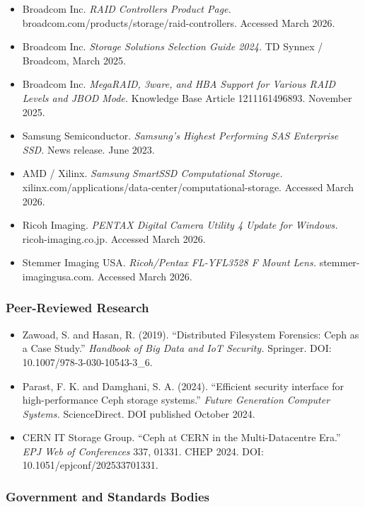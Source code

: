\documentclass[11pt,letterpaper]{article}
\begin{document}
\begin{itemize}[leftmargin=*]
  \item Broadcom Inc. \textit{RAID Controllers Product Page.} broadcom.com/products/storage/raid-controllers. Accessed March 2026.
  \item Broadcom Inc. \textit{Storage Solutions Selection Guide 2024.} TD Synnex / Broadcom, March 2025.
  \item Broadcom Inc. \textit{MegaRAID, 3ware, and HBA Support for Various RAID Levels and JBOD Mode.} Knowledge Base Article 1211161496893. November 2025.
  \item Samsung Semiconductor. \textit{Samsung's Highest Performing SAS Enterprise SSD.} News release. June 2023.
  \item AMD / Xilinx. \textit{Samsung SmartSSD Computational Storage.} xilinx.com/applications/data-center/computational-storage. Accessed March 2026.
  \item Ricoh Imaging. \textit{PENTAX Digital Camera Utility 4 Update for Windows.} ricoh-imaging.co.jp. Accessed March 2026.
  \item Stemmer Imaging USA. \textit{Ricoh/Pentax FL-YFL3528 F Mount Lens.} stemmer-imagingusa.com. Accessed March 2026.
\end{itemize}

\subsubsection{Peer-Reviewed Research}

\begin{itemize}[leftmargin=*]
  \item Zawoad, S. and Hasan, R. (2019). ``Distributed Filesystem Forensics: Ceph as a Case Study.'' \textit{Handbook of Big Data and IoT Security.} Springer. DOI: 10.1007/978-3-030-10543-3\_6.
  \item Parast, F. K. and Damghani, S. A. (2024). ``Efficient security interface for high-performance Ceph storage systems.'' \textit{Future Generation Computer Systems.} ScienceDirect. DOI published October 2024.
  \item CERN IT Storage Group. ``Ceph at CERN in the Multi-Datacentre Era.'' \textit{EPJ Web of Conferences} 337, 01331. CHEP 2024. DOI: 10.1051/epjconf/202533701331.
\end{itemize}

\subsubsection{Government and Standards Bodies}
\end{document}
